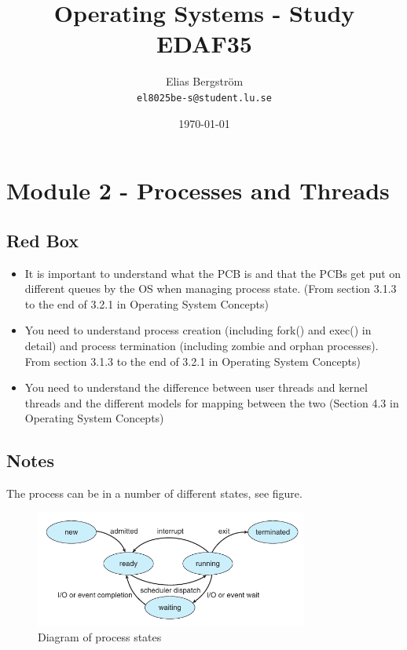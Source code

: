 \documentclass{article}
\title{\Huge Operating Systems - Study \\ EDAF35}
\author{  
    Elias Bergström\\
    \texttt{el8025be-s@student.lu.se}
    }
\date{\today}
\begin{document}
\maketitle
\thispagestyle{empty}
\pagebreak

\section{Module 2 - Processes and Threads}
\subsection{Red Box}
\begin{itemize}
    \item It is important to understand what the PCB is and that the PCBs get put on different queues by the OS when
    managing process state.
    (From section 3.1.3 to the end of 3.2.1 in Operating System Concepts)
    \item You need to understand process creation (including fork() and exec() in detail) and process termination (including
    zombie and orphan processes). From section 3.1.3 to the end of 3.2.1 in Operating System Concepts)
    \item You need to understand the difference between user threads and kernel threads and the different models for
    mapping between the two (Section 4.3 in Operating System Concepts)
\end{itemize}

\subsection{Notes}



The process can be in a number of different states, see figure.

\begin{figure}[H]
    \centering
    \includegraphics[width=0.8\textwidth]{pcb.png}
    \caption{Diagram of process states}
    \label{fig:diapcb}
\end{figure}
\end{document}

